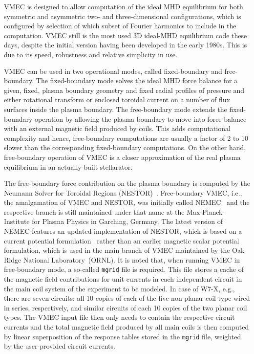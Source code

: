 \documentclass[a4paper,11pt]{book}
\begin{document}
VMEC is designed to allow computation of the ideal MHD equilibrium
for both symmetric and asymmetric two- and three-dimensional configurations,
which is configured by selection of which subset of Fourier harmonics to include in the computation.
%
VMEC still is the most used 3D ideal-MHD equilibrium code these days,
despite the initial version having been developed in the early 1980s.
%
This is due to its speed, robustness and relative simplicity in use.


VMEC can be used in two operational modes,
called fixed-boundary and free-boundary.
%
The fixed-boundary mode solves the ideal MHD force balance
for a given, fixed, plasma boundary geometry and fixed radial profiles
of pressure and either rotational transform or enclosed toroidal current
on a number of flux surfaces inside the plasma boundary.
%
The free-boundary mode extends the fixed-boundary operation
by allowing the plasma boundary to move into force balance
with an external magnetic field produced by coils.
%
This adds computational complexity and hence,
free-boundary computations are usually a factor of 2 to 10 slower
than the corresponding fixed-boundary computations.
%
On the other hand, free-boundary operation of VMEC
is a closer approximation of the real plasma equilibrium in an actually-built stellarator.


The free-boundary force contribution on the plasma boundary
is computed by the Neumann Solver for Toroidal Regions (NESTOR)~\cite{merkel_1986, merkel_1988}.
%
Free-boundary VMEC,
i.e., the amalgamation of VMEC and NESTOR,
was initially called NEMEC~\cite{hirshman_vanrij_merkel_1986}
and the respective branch is still maintained under that name
at the Max-Planck-Institute for Plasma Physics in Garching, Germany.
%
The latest version of NEMEC features an updated implementation of NESTOR,
which is based on a current potential formulation~\cite{merkel2015linearmhdstabilitystudies}
rather than an earlier magnetic scalar potential formulation,
which is used in the main branch of VMEC
maintained by the Oak Ridge National Laboratory~(ORNL).
%
It is noted that, when running VMEC in free-boundary mode,
a so-called \texttt{mgrid} file is required.
%
This file stores a cache of the magnetic field contributions
for unit currents in each independent circuit
in the main coil system of the experiment to be modeled.
%
In case of W7-X, e.g., there are seven circuits: all 10 copies of each of the five non-planar coil type wired in series, respectively,
and similar circuits of each 10 copies of the two planar coil types.
%
The VMEC input file then only needs to contain the respective circuit currents
and the total magnetic field produced by all main coils
is then computed by linear superposition of the response tables
stored in the \texttt{mgrid} file, weighted by the user-provided circuit currents.
\end{document}

